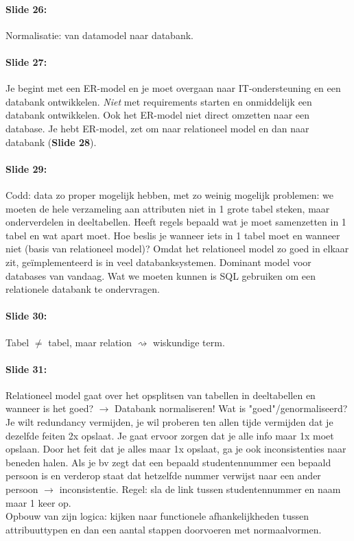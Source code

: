 \documentclass[10pt,a4paper]{report}
\begin{document}
\paragraph{Slide 26:}Normalisatie: van datamodel naar databank.

\paragraph{Slide 27:}Je begint met een ER-model en je moet overgaan naar IT-ondersteuning en een databank ontwikkelen. \emph{Niet} met requirements starten en onmiddelijk een databank ontwikkelen. Ook het ER-model niet direct omzetten naar een database. Je hebt ER-model, zet om naar relationeel model en dan naar databank (\textbf{Slide 28}).

\paragraph{Slide 29:}Codd: data zo proper mogelijk hebben, met zo weinig mogelijk problemen: we moeten de hele verzameling aan attributen niet in 1 grote tabel steken, maar onderverdelen in deeltabellen. Heeft regels bepaald wat je moet samenzetten in 1 tabel en wat apart moet. Hoe beslis je wanneer iets in 1 tabel moet en wanneer niet (basis van relationeel model)?
Omdat het relationeel model zo goed in elkaar zit, geïmplementeerd is in veel databanksystemen. Dominant model voor databases van vandaag. Wat we moeten kunnen is SQL gebruiken om een relationele databank te ondervragen.

\paragraph{Slide 30:}Tabel $\neq$ tabel, maar relation $\rightsquigarrow$ wiskundige term. 

\paragraph{Slide 31:}Relationeel model gaat over het opsplitsen van tabellen in deeltabellen en wanneer is het goed? $\rightarrow$ Databank normaliseren!
Wat is "goed"/genormaliseerd? Je wilt redundancy vermijden, je wil proberen ten allen tijde vermijden dat je dezelfde feiten 2x opslaat. Je gaat ervoor zorgen dat je alle info maar 1x moet opslaan. Door het feit dat je alles maar 1x opslaat, ga je ook inconsistenties naar beneden halen. Als je bv zegt dat een bepaald studentennummer een bepaald persoon is en verderop staat dat hetzelfde nummer verwijst naar een ander persoon $\rightarrow$ inconsistentie. Regel: sla de link tussen studentennummer en naam maar 1 keer op.\\
Opbouw van zijn logica: kijken naar functionele afhankelijkheden tussen attribuuttypen en dan een aantal stappen doorvoeren met normaalvormen.
\end{document}

